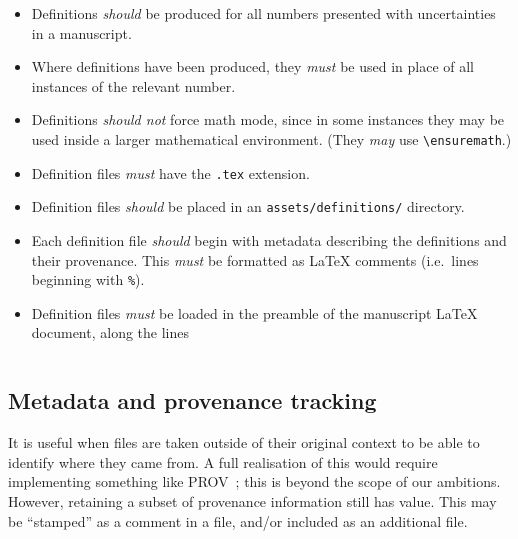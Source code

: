 \documentclass{article}
\newcommand\rfcword[1]{\emph{#1}\xspace}
\newcommand\must{\rfcword{must}}
\newcommand\should{\rfcword{should}}
\newcommand\shouldnot{\rfcword{should not}}
\newcommand\may{\rfcword{may}}
\newcommand\filename[1]{\texttt{#1}\xspace}
\begin{document}
\begin{itemize}
  \item
        Definitions \should be produced for all numbers presented with uncertainties in a manuscript.
  \item
        Where definitions have been produced,
        they \must be used in place of all instances of the relevant number.
  \item
        Definitions \shouldnot force math mode,
        since in some instances they may be used inside a larger mathematical environment.
        (They \may use \verb|\ensuremath|.)
  \item
        Definition files \must have the \filename{.tex} extension.
  \item
        Definition files \should be placed in an \filename{assets/definitions/} directory.
  \item
        Each definition file \should begin with metadata describing the definitions and their provenance.
        This \must be formatted as LaTeX comments
        (i.e.\ lines beginning with \verb|%|).
  \item
        Definition files \must be loaded in the preamble of the manuscript LaTeX document,
        along the lines
\begin{verbatim}

\end{verbatim}
\end{itemize}

\subsection{Metadata and provenance tracking}

It is useful
when files are taken outside of their original context
to be able to identify where they came from.
A full realisation of this would require implementing something like PROV~\cite{prov};
this is beyond the scope of our ambitions.
However,
retaining a subset of provenance information still has value.
This may be ``stamped'' as a comment in a file,
and/or included as an additional file.
\end{document}
